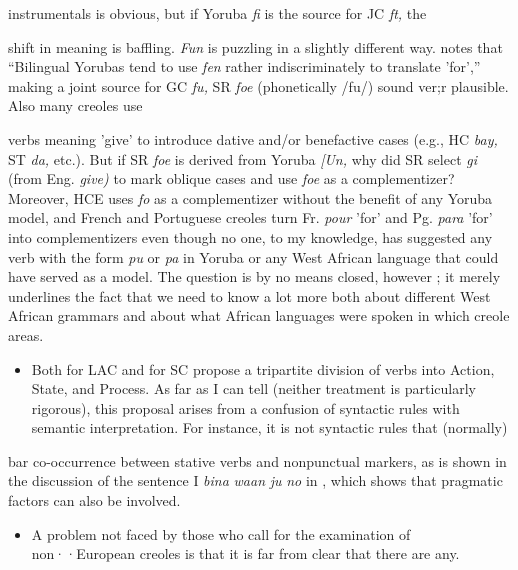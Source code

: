 \begin{itemize}
\begin{itemize}
\begin{itemize}
\begin{itemize}
instrumentals is obvious, but if Yoruba \textit{fi} is the source for JC \textit{ft,} the

shift in meaning is baffling. \textit{Fun} is puzzling in a slightly different way. \citet{Rowlands1969} notes that ``Bilingual Yorubas tend to use \textit{fen} rather indiscriminately to translate 'for','' making a joint source for GC \textit{fu,} SR \textit{foe }(phonetically /fu/) sound ver;r plausible. Also many creoles use


verbs meaning 'give' to introduce dative and/or benefactive cases (e.g., HC \textit{bay,} ST \textit{da,} etc.). But if SR \textit{foe} is derived from Yoruba \textit{[Un,} why did SR select \textit{gi} (from Eng. \textit{give}\textit{)} to mark oblique cases and use \textit{foe} as a complementizer? Moreover, HCE uses \textit{fo} as a complementizer without the benefit of any Yoruba model, and French and Portuguese creoles turn Fr. \textit{pour} 'for' and Pg. \textit{para} 'for' into complementizers even though no one, to my knowledge, has suggested any verb with the form \textit{pu} or \textit{pa} in Yoruba or any West African language that could have served as a model. The question is by no means closed, however ; it merely underlines the fact that we need to know a lot more both about different West African grammars and about what African lan\-guages were spoken in which creole areas.

\begin{itemize}
\item Both \citet{Christie1976} for LAC and \citet{Corne1981} for SC propose a tripartite division of verbs into Action, State, and Process. As far as I can tell (neither treatment is particularly rigorous), this proposal arises from a confusion of syntactic rules with semantic interpretation. For instance, it is not syntactic rules that (normally)
\end{itemize}

bar co-occurrence between stative verbs and nonpunctual markers, as is shown in the discussion of the sentence I \textit{bina} \textit{waan} \textit{ju} \textit{no} in \citet[38]{Bickerton1975}, which shows that pragmatic factors can also be involved.

\begin{itemize}
\item A problem not faced by those who call for the examination of non··European creoles is that it is far from clear that there are any.
\end{itemize}


\end{itemize}
\end{itemize}
\end{itemize}
\end{itemize}
